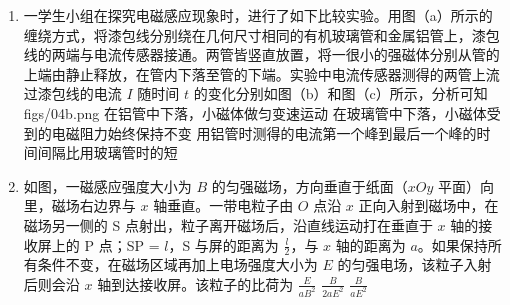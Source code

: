 \documentclass[\gkver]{gaokaozhenti}
\begin{document}
\begin{enumerate}
{$$ \Delta m=\frac{E_{0}}{60c^{2}}=\frac{10^{48}}{60\times\left(3\times10^{8}\right)^{2}}=\frac{10^{30}}{5.4}kg $$

则每秒钟平均减少的质量量级为  $10^{29}$ $\Ukg$。

故选 C。
}

\item
一学生小组在探究电磁感应现象时，进行了如下比较实验。用图（a）所示的缠绕方式，将漆包线分别绕在几何尺寸相同的有机玻璃管和金属铝管上，漆包线的两端与电流传感器接通。两管皆竖直放置，将一很小的强磁体分别从管的上端由静止释放，在管内下落至管的下端。实验中电流传感器测得的两管上流过漆包线的电流 $I$ 随时间 $t$ 的变化分别如图（b）和图（c）所示，分析可知
{figs/04b.png}
{在铝管中下落，小磁体做匀变速运动}
{在玻璃管中下落，小磁体受到的电磁阻力始终保持不变}
{用铝管时测得的电流第一个峰到最后一个峰的时间间隔比用玻璃管时的短}

\item
如图，一磁感应强度大小为 $B$ 的匀强磁场，方向垂直于纸面（$xOy$ 平面）向里，磁场右边界与 $x$ 轴垂直。一带电粒子由 $O$ 点沿 $x$ 正向入射到磁场中，在磁场另一侧的 S 点射出，粒子离开磁场后，沿直线运动打在垂直于 $x$ 轴的接收屏上的 P 点；SP = $l$，S 与屏的距离为 $\frac{l}{2}$，与 $x$ 轴的距离为 $a$。如果保持所有条件不变，在磁场区域再加上电场强度大小为 $E$ 的匀强电场，该粒子入射后则会沿 $x$ 轴到达接收屏。该粒子的比荷为
{$\frac{E}{{a{B^2}}}$}
{$\frac{B}{{2a{E^2}}}$}
{$\frac{B}{{a{E^2}}}$}
\end{enumerate}
\end{document}
